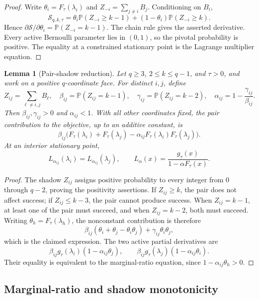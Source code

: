 \documentclass[11pt]{article}
\newtheorem{lemma}{Lemma}
\theoremstyle{definition}
\theoremstyle{remark}
\newcommand{\Pbb}{\mathbb P}
\newcommand{\1}{\mathbf 1}
\begin{document}
\begin{proof}
Write \(\theta_i=F_\tau(\lambda_i)\) and \(Z_{-i}=\sum_{j\ne i}B_j\).  Conditioning on \(B_i\),
\[
  \mathcal S_{q,k,\tau}
  =\theta_i\Pbb(Z_{-i}\ge k-1)
    +(1-\theta_i)\Pbb(Z_{-i}\ge k).
\]
Hence \(\partial\mathcal S/\partial\theta_i=\Pbb(Z_{-i}=k-1)\).  The chain rule gives the asserted derivative.  Every active Bernoulli parameter lies in \((0,1)\), so the pivotal probability is positive.  The equality at a constrained stationary point is the Lagrange multiplier equation.
\end{proof}

\begin{lemma}[Pair-shadow reduction]
\label{lem:pair-shadow-reduction}
Let \(q\ge3\), \(2\le k\le q-1\), and \(\tau>0\), and work on a positive \(q\)-coordinate face.  For distinct \(i,j\), define
\[
  Z_{ij}=\sum_{\ell\ne i,j}B_\ell,
  \quad
  \beta_{ij}=\Pbb(Z_{ij}=k-1),
  \quad
  \gamma_{ij}=\Pbb(Z_{ij}=k-2),
  \quad
  \alpha_{ij}=1-\frac{\gamma_{ij}}{\beta_{ij}}.
\]
Then \(\beta_{ij},\gamma_{ij}>0\) and \(\alpha_{ij}<1\).  With all other coordinates fixed, the pair contribution to the objective, up to an additive constant, is
\[
  \beta_{ij}\bigl(F_\tau(\lambda_i)+F_\tau(\lambda_j)
                -\alpha_{ij}F_\tau(\lambda_i)F_\tau(\lambda_j)\bigr).
\]
At an interior stationary point,
\[
  L_{\alpha_{ij}}(\lambda_i)=L_{\alpha_{ij}}(\lambda_j),
  \qquad
  L_\alpha(x)=\frac{g_\tau(x)}{1-\alpha F_\tau(x)}.
\]
\end{lemma}

\begin{proof}
The shadow \(Z_{ij}\) assigns positive probability to every integer from \(0\) through \(q-2\), proving the positivity assertions.  If \(Z_{ij}\ge k\), the pair does not affect success; if \(Z_{ij}\le k-3\), the pair cannot produce success.  When \(Z_{ij}=k-1\), at least one of the pair must succeed, and when \(Z_{ij}=k-2\), both must succeed.  Writing \(\theta_h=F_\tau(\lambda_h)\), the nonconstant contribution is therefore
\[
  \beta_{ij}(\theta_i+\theta_j-\theta_i\theta_j)
  +\gamma_{ij}\theta_i\theta_j,
\]
which is the claimed expression.  The two active partial derivatives are
\[
  \beta_{ij}g_\tau(\lambda_i)(1-\alpha_{ij}\theta_j),
  \qquad
  \beta_{ij}g_\tau(\lambda_j)(1-\alpha_{ij}\theta_i).
\]
Their equality is equivalent to the marginal-ratio equation, since
\(1-\alpha_{ij}\theta_h>0\).
\end{proof}

\subsection{Marginal-ratio and shadow monotonicity}
\end{document}
